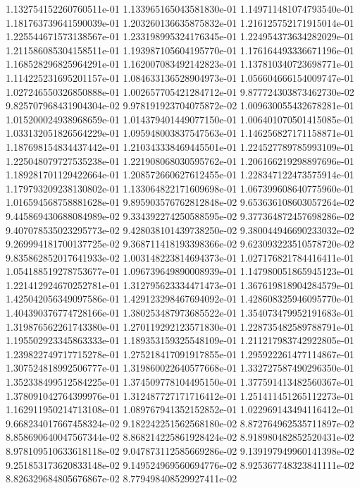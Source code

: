 1.132754152260760511e-01
1.133965165043581830e-01
1.149711481074793540e-01
1.181763739641590039e-01
1.203260136635875832e-01
1.216125752171915014e-01
1.225544671573138567e-01
1.233198995324176345e-01
1.224954373634282029e-01
1.211586085304158511e-01
1.193987105604195770e-01
1.176164493336671196e-01
1.168528296825964291e-01
1.162007083492142823e-01
1.137810340723698771e-01
1.114225231695201157e-01
1.084633136528904973e-01
1.056604666154009747e-01
1.027246550326850888e-01
1.002657705421284712e-01
9.877724303873462730e-02
9.825707968431904304e-02
9.978191923704075872e-02
1.009630055432678281e-01
1.015200024938968659e-01
1.014379401449077150e-01
1.006401070501415085e-01
1.033132051826564229e-01
1.095948003837547563e-01
1.146256827171158871e-01
1.187698154834437442e-01
1.210343338469445501e-01
1.224527789785993109e-01
1.225048079727535238e-01
1.221908068030595762e-01
1.206166219298897696e-01
1.189281701129422664e-01
1.208572660627612455e-01
1.228347122473575914e-01
1.179793209238130802e-01
1.133064822171609698e-01
1.067399608640775960e-01
1.016594568758881628e-01
9.895903576762812848e-02
9.653636108603057264e-02
9.445869430688084989e-02
9.334392274250588595e-02
9.377364872457698286e-02
9.407078535023295773e-02
9.428038101439738250e-02
9.380044946690233032e-02
9.269994181700137725e-02
9.368711418193398366e-02
9.623093223510578720e-02
9.835862852017641933e-02
1.003148223814694373e-01
1.027176821784416411e-01
1.054188519278753677e-01
1.096739649890008939e-01
1.147980051865945123e-01
1.221412924670252781e-01
1.312795623334471473e-01
1.367619818904284579e-01
1.425042056349097586e-01
1.429123298467694092e-01
1.428608325946095770e-01
1.404390376774728166e-01
1.380253487973685522e-01
1.354073479952191683e-01
1.319876562261743380e-01
1.270119292123571830e-01
1.228735482589788791e-01
1.195502923345863333e-01
1.189353159325548109e-01
1.211217983742922805e-01
1.239822749717715278e-01
1.275218417091917855e-01
1.295922261477114867e-01
1.307524818992506777e-01
1.319860022640577668e-01
1.332727587490296350e-01
1.352338499512584225e-01
1.374509778104495150e-01
1.377591413482560367e-01
1.378091042764399976e-01
1.312487727171716412e-01
1.251411451265112273e-01
1.162911950214713108e-01
1.089767941352152852e-01
1.022969143494116412e-01
9.668234017667458324e-02
9.182242251562568180e-02
8.872764962535711897e-02
8.858690640047567344e-02
8.868214225861928424e-02
8.918980482852520431e-02
8.978109510633618118e-02
9.047873112585669286e-02
9.139197949960141398e-02
9.251853173620833148e-02
9.149524969560694776e-02
8.925367748323841111e-02
8.826329684805676867e-02
8.779498408529927411e-02
